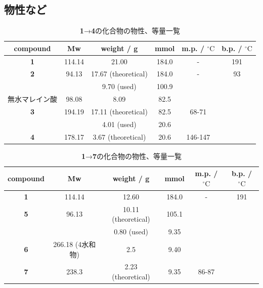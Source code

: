 \documentclass{ltjsarticle}
\theoremstyle{definition}
\numberwithin{equation}{section}
\newcommand{\D}{^\circ\text{C}}
\begin{document}
\subsection{物性など}
\begin{table}[htp]
\caption{\textbf{1}→\textbf{4}の化合物の物性、等量一覧}
\begin{center}
\begin{tabular}{cccccc}
\toprule
compound & Mw & weight / g & mmol & m.p. / $\D$ & b.p. / $\D$\\
\midrule
\textbf{1} & 114.14 & 21.00 & 184.0 & - & 191\\
\textbf{2} & 94.13 & 17.67 (theoretical) & 184.0 & - & 93\\
  &  & 9.70 (used) & 100.9 & \\
無水マレイン酸 & 98.08 & 8.09  & 82.5 & \\
\textbf{3} & 194.19 & 17.11 (theoretical) & 82.5 & 68-71 & \\
  &  & 4.01 (used) & 20.6 & \\
\textbf{4} & 178.17 & 3.67 (theoretical) & 20.6 & 146-147 & \\
\bottomrule
\end{tabular}
\end{center}
\label{properties_6-1}
\end{table}%

\begin{table}[htp]
\caption{\textbf{1}→\textbf{7}の化合物の物性、等量一覧}
\begin{center}
\begin{tabular}{cccccc}
\toprule
compound & Mw & weight / g & mmol & m.p. / $\D$ & b.p. / $\D$\\
\midrule
\textbf{1} & 114.14 & 12.60 & 184.0 & - & 191\\
\textbf{5} & 96.13 & 10.11 (theoretical) & 105.1 & \\%
  &  & 0.80 (used) & 9.35 & \\
\textbf{6} & 266.18 (4水和物) & 2.5 & 9.40 & & \\
\textbf{7} & 238.3 & 2.23 (theoretical) & 9.35 & 86-87 & \\
\bottomrule
\end{tabular}
\end{center}
\label{properties_6-2}
\end{table}%
 
\newpage
\end{document}
